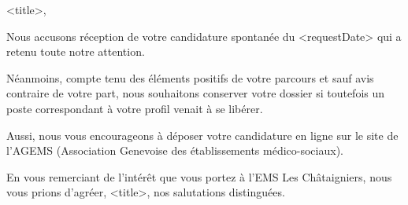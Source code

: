 
<title>,

Nous accusons réception de votre candidature spontanée du <requestDate> qui a retenu toute notre attention.

Néanmoins, compte tenu des éléments positifs de votre parcours et sauf avis contraire de votre part, nous souhaitons conserver votre dossier si toutefois un poste correspondant à votre profil venait à se libérer.

Aussi, nous vous encourageons à déposer votre candidature en ligne sur le site de l’AGEMS (Association Genevoise des établissements médico-sociaux).

En vous remerciant de l’intérêt que vous portez à l’EMS Les Châtaigniers, nous vous prions d’agréer, <title>, nos salutations distinguées.



